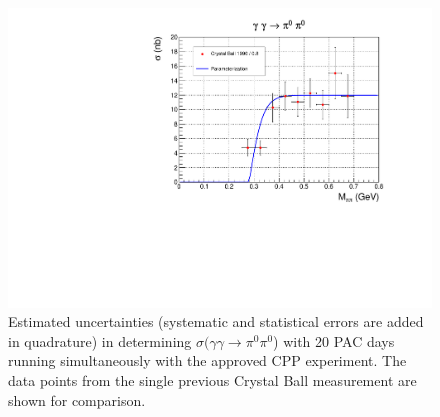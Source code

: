\begin{figure}[tb]
\centering
\includegraphics[page=4,width=4.75in]{figures/sigma_2pi0_figs.pdf}
\caption{Estimated uncertainties (systematic and statistical errors are added in quadrature) in determining $\sigma(\gamma\gamma\rightarrow\pi^0\pi^0$) with 20 PAC days running simultaneously with the approved CPP experiment. The data points from the single previous Crystal Ball measurement \cite{Marsiske:1990hx} are shown for comparison.
\label{fig:sigma_2pi0_figs_4}}
\end{figure}






